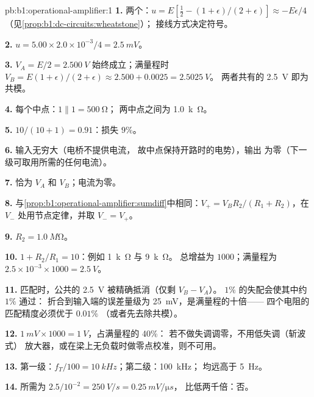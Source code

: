 \begin{solution}{pb:b1:operational-amplifier:1}
\textbf{1.} 两个：$u = E[\tfrac12 - (1 + \epsilon)/(2 + \epsilon)]
\approx -E\epsilon/4$（见\cref{prop:b1:dc-circuits:wheatstone}）；
接线方式决定符号。

\textbf{2.} $u = 5.00 \times 2.0\times10^{-3}/4 = \qty{2.5}{mV}$。

\textbf{3.} $V_A = E/2 = \qty{2.500}{V}$ 始终成立；满量程时 $V_B = E(1 + \epsilon)/(2 +
\epsilon) \approx 2.500 + 0.0025 = \qty{2.5025}{V}$。
两者共有的 \qty{2.5}{V} 即为共模。

\textbf{4.} 每个中点：$1 \parallel 1 = \qty{500}{\ohm}$；
两中点之间为 \qty{1.0}{k\ohm}。

\textbf{5.} $10/(10 + 1) = 0.91$：损失 $9\%$。

\textbf{6.} 输入无穷大（电桥不提供电流，
故中点保持开路时的电势），输出
为零（下一级可取用所需的任何电流）。

\textbf{7.} 恰为 $V_A$ 和 $V_B$；电流为零。

\textbf{8.} 与\cref{prop:b1:operational-amplifier:sumdiff}中相同：$V_+ =
V_BR_2/(R_1 + R_2)$，在 $V_-$ 处用节点定律，并取 $V_- = V_+$。

\textbf{9.} $R_2 = \qty{1.0}{M\ohm}$。

\textbf{10.} $1 + R_2/R_1 = 10$：例如 \qty{1}{k\ohm} 与 \qty{9}{k\ohm}。
总增益为 $1000$；满量程为 $2.5 \times 10^{-3} \times 1000 = \qty{2.5}{V}$。

\textbf{11.} 匹配时，公共的 \qty{2.5}{V} 被精确抵消（仅剩 $V_B - V_A$）。
$1\%$ 的失配会使其中约 $1\%$ 通过：
折合到输入端的误差量级为 \qty{25}{mV}，是满量程的十倍——
四个电阻的匹配精度必须优于 $0.01\%$
（或者先去除共模）。

\textbf{12.} $1\ \unit{mV} \times 1000 = \qty{1}{V}$，占满量程的 40\%：
若不做失调调零，不用低失调（斩波式）
放大器，或在梁上无负载时做零点校准，则不可用。

\textbf{13.} 第一级：$f_T/100 = \qty{10}{kHz}$；第二级：\qty{100}{kHz}；
均远高于 \qty{5}{Hz}。

\textbf{14.} 所需为 $2.5/10^{-2} = \qty{250}{V/s} = \qty{0.25}{mV/\micro s}$，
比低两千倍：否。


\end{solution}
